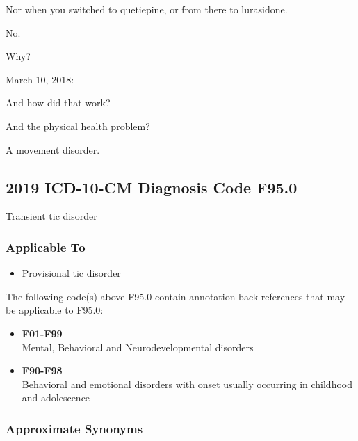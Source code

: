 \begin{paracol}{2}
\begin{leftcolumn}
\begin{ally}
Nor when you switched to quetiepine, or from there to lurasidone.
\end{ally}
No.

\begin{ally}
Why?
\end{ally}
March 10, 2018:

\begin{ally}
And how did that work?
\end{ally}
\begin{ally}
And the physical health problem?
\end{ally}
A movement disorder.
\newpage

\hypertarget{icd-10-cm-diagnosis-code-f95.0}{%
\subsection{2019 ICD-10-CM Diagnosis Code F95.0}\label{icd-10-cm-diagnosis-code-f95.0}}

Transient tic disorder

\hypertarget{applicable-to}{%
\subsubsection{Applicable To}\label{applicable-to}}

\begin{itemize}
\tightlist
\item
  Provisional tic disorder
\end{itemize}

\noindent The following code(s) above F95.0 contain annotation back-references that may be applicable to F95.0:

\begin{itemize}
\tightlist
\item
  \textbf{F01-F99}\\
  Mental, Behavioral and Neurodevelopmental disorders
\item
  \textbf{F90-F98}\\
  Behavioral and emotional disorders with onset usually occurring in childhood and adolescence
\end{itemize}

\hypertarget{approximate-synonyms}{%
\subsubsection{Approximate Synonyms}\label{approximate-synonyms}}


\end{leftcolumn}
\end{paracol}

